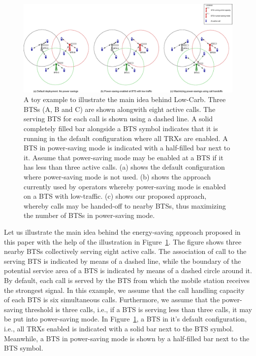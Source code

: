 \begin{figure}
\includegraphics[width=1\textwidth]{figures/illustrationall.eps}
\caption{A toy example to illustrate the main idea behind Low-Carb. Three BTSs (A, B and C) are shown alongwith eight active calls. The serving BTS for each call is shown using a dashed line. A solid completely filled bar alongside a BTS symbol indicates that it is running in the default configuration where all TRXs are enabled. A BTS in power-saving mode is indicated with a half-filled bar next to it. Assume that power-saving mode may be enabled at a BTS if it has less than three active calls. (a) shows the default configuration where power-saving mode is not used. (b) shows the approach currently used by operators whereby power-saving mode is enabled on a BTS with low-traffic. (c) shows our proposed approach, whereby calls may be handed-off to nearby BTSs, thus maximizing the number of BTSs in power-saving mode.}
\label{fig:illustrationall}
\end{figure}


Let us illustrate the main idea behind the energy-saving approach proposed in this paper with the help of the illustration in Figure~\ref{fig:illustrationall}. The figure shows three nearby BTSs collectively serving eight active calls. The association of call to the serving BTS is indicated by means of a dashed line, while the boundary of the potential service area of a BTS is indicated by means of a dashed circle around it. By default, each call is served by the BTS from which the mobile station receives the strongest signal. In this example, we assume that the call handling capacity of each BTS is six simultaneous calls. Furthermore, we assume that the power-saving threshold is three calls, i.e., if a BTS is serving less than three calls, it may be put into power-saving mode. In Figure~\ref{fig:illustrationall}, a BTS in it's default configuration, i.e., all TRXs enabled is indicated with a solid bar next to the BTS symbol. Meanwhile, a BTS in power-saving mode is shown by a half-filled bar next to the BTS symbol.


